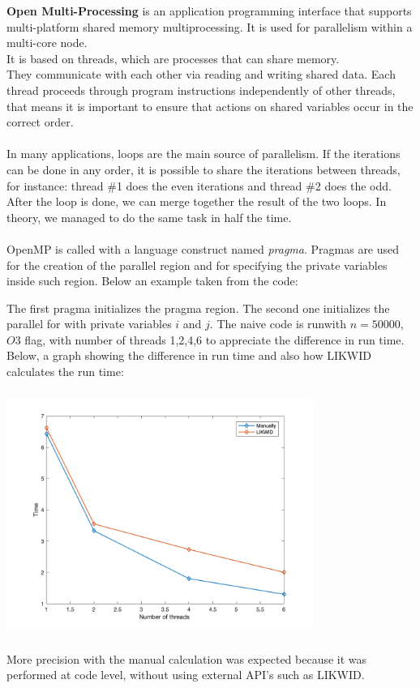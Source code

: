 \documentclass[11pt,a4paper,oneside,titlepage,openright]{book}
\begin{document}
\textbf{Open Multi-Processing} is an application programming interface that supports multi-platform shared memory multiprocessing. It is used for parallelism within a multi-core node.\\ It is based on threads, which are processes that can share memory. \\They communicate with each other via reading and writing shared data. 
Each thread proceeds through program instructions independently of other threads, that means it is important to ensure that actions on shared variables occur in the correct order.\\\\
In many applications, loops are the main source of parallelism. If the iterations can be done in any order, it is possible to share the iterations between threads, for instance: thread \#1 does the even iterations and thread \#2 does the odd. After the loop is done, we can merge together the result of the two loops. In theory, we managed to do the same task in half the time.\\\\
OpenMP is called with a language construct named \textit{pragma}. Pragmas are used for the creation of the parallel region and for specifying the private variables inside such region. Below an example taken from the code:

The first pragma initializes the pragma region. The second one initializes the parallel for with private variables $i$ and $j$.
The naive code is runwith $n = 50000$, $O3$ flag, with number of threads 1,2,4,6 to appreciate the difference in run time. Below, a graph showing the difference in run time and also how LIKWID calculates the run time:
\begin{center}
\includegraphics[width=10cm, height=8cm]{graficotimes}
\end{center}
More precision with the manual calculation was expected because it was performed at code level, without using external API's such as LIKWID.
\end{document}
